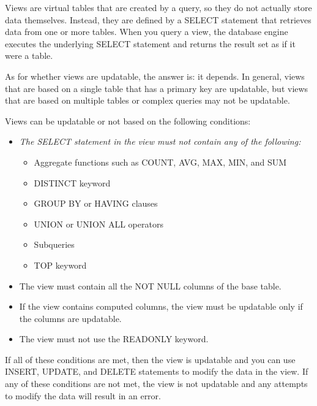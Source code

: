 \documentclass{article}
\begin{document}
Views are virtual tables that are created by a query, so they do not actually store data themselves. Instead, they are defined by a SELECT statement that retrieves data from one or more tables. When you query a view, the database engine executes the underlying SELECT statement and returns the result set as if it were a table.

As for whether views are updatable, the answer is: it depends. In general, views that are based on a single table that has a primary key are updatable, but views that are based on multiple tables or complex queries may not be updatable.

Views can be updatable or not based on the following conditions:
\begin{itemize}
    \item \textit{The SELECT statement in the view must not contain any of the following:} 
    \begin{itemize}
        \item Aggregate functions such as COUNT, AVG, MAX, MIN, and SUM
        \item DISTINCT keyword
        \item GROUP BY or HAVING clauses
        \item UNION or UNION ALL operators
        \item Subqueries
        \item TOP keyword
    \end{itemize}
    \item The view must contain all the NOT NULL columns of the base table.
    \item If the view contains computed columns, the view must be updatable only if the columns are updatable.
    \item The view must not use the READONLY keyword.
\end{itemize}
If all of these conditions are met, then the view is updatable and you can use INSERT, UPDATE, and DELETE statements to modify the data in the view. If any of these conditions are not met, the view is not updatable and any attempts to modify the data will result in an error.
\end{document}
